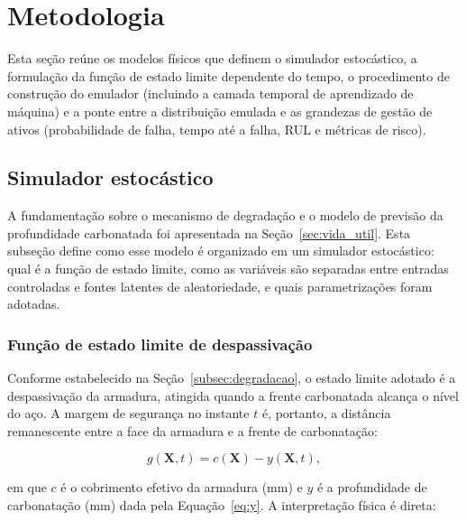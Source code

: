 \section{Metodologia}\label{sec:metodologia}

Esta seção reúne os modelos físicos que definem o simulador estocástico, a formulação da função de estado limite dependente do tempo, o procedimento de construção do emulador (incluindo a camada temporal de aprendizado de máquina) e a ponte entre a distribuição emulada e as grandezas de gestão de ativos (probabilidade de falha, tempo até a falha, RUL e métricas de risco).

\subsection{Simulador estoc\'astico}
\label{subsec:carbonatacao}

A fundamentação sobre o mecanismo de degradação e o modelo de previsão da profundidade carbonatada foi apresentada na Seção~\ref{sec:vida_util}. Esta subseção define como esse modelo é organizado em um simulador estocástico: qual é a função de estado limite, como as variáveis são separadas entre entradas controladas e fontes latentes de aleatoriedade, e quais parametrizações foram adotadas.

\subsubsection{Fun\c{c}\~ao de estado limite de despassiva\c{c}\~ao}
\label{subsec:funcao_g}

Conforme estabelecido na Seção~\ref{subsec:degradacao}, o estado limite adotado é a despassivação da armadura, atingida quando a frente carbonatada alcança o nível do aço. A margem de segurança no instante $t$ é, portanto, a distância remanescente entre a face da armadura e a frente de carbonatação:

\begin{equation}\label{eq:funcao_g}
g(\mathbf{X}, t) = c(\mathbf{X}) - y(\mathbf{X}, t),
\end{equation}

\noindent em que $c$ é o cobrimento efetivo da armadura (mm) e $y$ é a profundidade de carbonatação (mm) dada pela Equação~\eqref{eq:y}. A interpretação física é direta:

